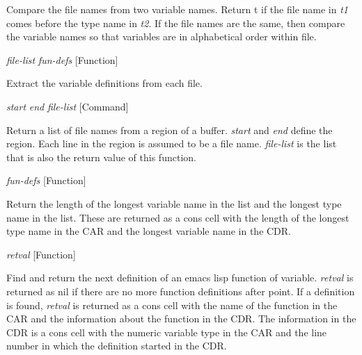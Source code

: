 \begin{doc-string}
Compare the file names from two variable names.  Return t if the file
name in \emph{t1} comes before the type name in \emph{t2}.  If the file names are the same,
then compare the variable names so that variables are in alphabetical order
within file.
\end{doc-string}

\vspace{1em}
\noindent
{}
\usebox{\funcname}\emph{file-list} \emph{fun-defs}
 \hfill [Function]

\begin{doc-string}
Extract the variable definitions from each file.
\end{doc-string}

\vspace{1em}
\noindent
{}
\usebox{\funcname}\emph{start} \emph{end} \emph{file-list}
 \hfill [Command]

\begin{doc-string}
Return a list of file names from a region of a buffer.  \emph{start} and \emph{end}
define the region.  Each line in the region is assumed to be a file name.
\emph{file-list} is the list that is also the return value of this function.
\end{doc-string}

\vspace{1em}
\noindent
{}
\usebox{\funcname}\emph{fun-defs}
 \hfill [Function]

\begin{doc-string}
 Return the length of the longest variable name in the list and the longest type
name in the list.  These are returned as a cons cell with the length of the longest
type name in the CAR and the longest variable name in the CDR.
\end{doc-string}

\vspace{1em}
\noindent
{}
\usebox{\funcname}\emph{retval}
 \hfill [Function]

\begin{doc-string}
Find and return the next definition of an emacs lisp function of variable.
   \emph{retval} is returned
as nil if there are no more function definitions after point.  If a definition
is found, \emph{retval} is returned as a cons cell with the name of the function
in the CAR and the information about the function in the CDR.  The information in the
CDR is a cons cell with the numeric variable type in the CAR and the line number in
which the definition started in the CDR.
\end{doc-string}

